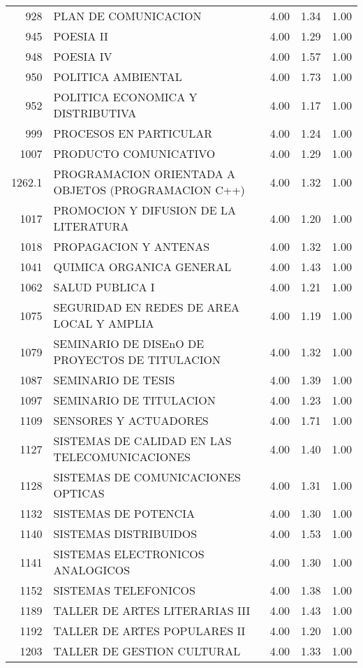 \begin{table}[ht]
\begin{tabular}{rlrrr}
  928 & PLAN DE COMUNICACION & 4.00 & 1.34 & 1.00 \\ 
  945 & POESIA II & 4.00 & 1.29 & 1.00 \\ 
  948 & POESIA IV & 4.00 & 1.57 & 1.00 \\ 
  950 & POLITICA AMBIENTAL & 4.00 & 1.73 & 1.00 \\ 
  952 & POLITICA ECONOMICA Y DISTRIBUTIVA & 4.00 & 1.17 & 1.00 \\ 
  999 & PROCESOS EN PARTICULAR & 4.00 & 1.24 & 1.00 \\ 
  1007 & PRODUCTO COMUNICATIVO & 4.00 & 1.29 & 1.00 \\ 
  1262.1 & PROGRAMACION ORIENTADA A OBJETOS (PROGRAMACION C++) & 4.00 & 1.32 & 1.00 \\ 
  1017 & PROMOCION Y DIFUSION DE LA LITERATURA & 4.00 & 1.20 & 1.00 \\ 
  1018 & PROPAGACION Y ANTENAS & 4.00 & 1.32 & 1.00 \\ 
  1041 & QUIMICA ORGANICA GENERAL & 4.00 & 1.43 & 1.00 \\ 
  1062 & SALUD PUBLICA I & 4.00 & 1.21 & 1.00 \\ 
  1075 & SEGURIDAD EN REDES DE AREA LOCAL Y AMPLIA & 4.00 & 1.19 & 1.00 \\ 
  1079 & SEMINARIO DE DISEnO DE PROYECTOS DE TITULACION & 4.00 & 1.32 & 1.00 \\ 
  1087 & SEMINARIO DE TESIS & 4.00 & 1.39 & 1.00 \\ 
  1097 & SEMINARIO DE TITULACION & 4.00 & 1.23 & 1.00 \\ 
  1109 & SENSORES Y ACTUADORES & 4.00 & 1.71 & 1.00 \\ 
  1127 & SISTEMAS DE CALIDAD EN LAS TELECOMUNICACIONES & 4.00 & 1.40 & 1.00 \\ 
  1128 & SISTEMAS DE COMUNICACIONES OPTICAS & 4.00 & 1.31 & 1.00 \\ 
  1132 & SISTEMAS DE POTENCIA & 4.00 & 1.30 & 1.00 \\ 
  1140 & SISTEMAS DISTRIBUIDOS & 4.00 & 1.53 & 1.00 \\ 
  1141 & SISTEMAS ELECTRONICOS ANALOGICOS & 4.00 & 1.30 & 1.00 \\ 
  1152 & SISTEMAS TELEFONICOS & 4.00 & 1.38 & 1.00 \\ 
  1189 & TALLER DE ARTES LITERARIAS III & 4.00 & 1.43 & 1.00 \\ 
  1192 & TALLER DE ARTES POPULARES II & 4.00 & 1.20 & 1.00 \\ 
  1203 & TALLER DE GESTION CULTURAL & 4.00 & 1.33 & 1.00 \\ 

\end{tabular}
\end{table}

